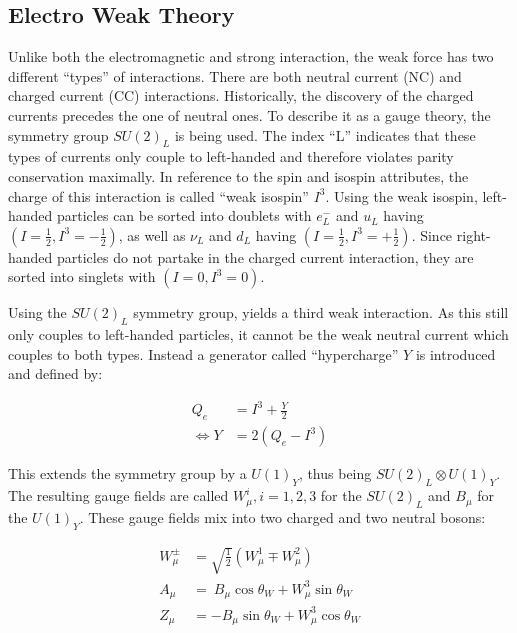 \subsection{Electro Weak Theory}

Unlike both the electromagnetic and strong interaction, the weak force has two different ``types'' of interactions. There are both neutral current (NC) and charged current (CC) interactions. Historically, the discovery of the charged currents precedes the one of neutral ones. To describe it as a gauge theory, the symmetry group $SU(2)_L$ is being used. The index ``L'' indicates that these types of currents only couple to left-handed and therefore violates parity conservation maximally. In reference to the spin and isospin attributes, the charge of this interaction is called ``weak isospin'' $I^3$. Using the weak isospin, left-handed particles can be sorted into doublets with $e^-_L$ and $u_L$ having $(I = \frac{1}{2}, I^3 = -\frac{1}{2})$, as well as $\nu_L$ and $d_L$ having $(I = \frac{1}{2}, I^3 = +\frac{1}{2})$. Since right-handed particles do not partake in the charged current interaction, they are sorted into singlets with $(I = 0, I^3 = 0)$.

Using the $SU(2)_L$ symmetry group, yields a third weak interaction. As this still only couples to left-handed particles, it cannot be the weak neutral current which couples to both types. Instead a generator called ``hypercharge'' $Y$ is introduced and defined by:

\begin{align}
  \label{eq:hypercharge}
                  Q_e &= I^3 + \frac{Y}{2} \\
  \Leftrightarrow Y   &= 2 \left( Q_e - I^3 \right)
\end{align}

\noindent This extends the symmetry group by a $U(1)_Y$, thus being $SU(2)_L \otimes U(1)_Y$. The resulting gauge fields are called $W^i_\mu, i = 1,2,3$ for the $SU(2)_L$ and $B_\mu$ for the $U(1)_Y$. These gauge fields mix into two charged and two neutral bosons:

\begin{align}
  \label{eq:ewbosons}
  W^\pm_\mu & = \sqrt{\frac{1}{2}} \left( W^1_\mu \mp W^2_\mu \right) \\
  A_\mu & = \ B_\mu \cos{\theta_W} + W^3_\mu \sin{\theta_W} \\
  Z_\mu & = - B_\mu \sin{\theta_W} + W^3_\mu \cos{\theta_W}
\end{align}
 
